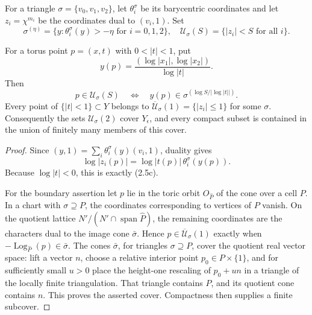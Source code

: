 For a triangle \(\sigma=\{v_0,v_1,v_2\}\), let
\(\theta_i^\sigma\) be its barycentric coordinates and let
\(z_i=\chi^{m_i}\) be the coordinates dual to
\((v_i,1)\).  Set
\[
 \sigma^{(\eta)}=\{y:\theta_i^\sigma(y)>-\eta\text{ for }i=0,1,2\},
 \quad
 \mathcal U_\sigma(S)=\{|z_i|<S\text{ for all }i\}.
\]

\begin{lemma}
\label{lem:toric-chart-control}
For a torus point \(p=(x,t)\) with \(0<|t|<1\), put
\[
 y(p)=\frac{(\log|x_1|,\log|x_2|)}{\log|t|}.
\]
Then
\[
 p\in\mathcal U_\sigma(S)
 \quad\Longleftrightarrow\quad
 y(p)\in\sigma^{(\log S/|\log|t||)}.
 \tag{2.5c}
\]
Every point of \(\{|t|<1\}\subset Y\) belongs to
\(\overline{\mathcal U}_\sigma(1)=\{|z_i|\le1\}\) for some \(\sigma\).
Consequently the sets \(\mathcal U_\sigma(2)\) cover \(Y_\epsilon\), and
every compact subset is contained in the union of finitely many members of
this cover.
\end{lemma}

\begin{proof}
Since \((y,1)=\sum_i\theta_i^\sigma(y)(v_i,1)\), duality gives
\[
 \log|z_i(p)|=\log|t(p)|\,\theta_i^\sigma(y(p)).
\]
Because \(\log|t|<0\), this is exactly (2.5c).

For the boundary assertion let \(p\) lie in the toric orbit
\(O_{\widehat P}\) of the cone over a cell \(P\).  In a chart with
\(\sigma\supseteq P\), the coordinates corresponding to vertices of
\(P\) vanish.  On the quotient lattice
\(N'/(N'\cap\operatorname{span}\widehat P)\), the remaining coordinates
are the characters dual to the image cone \(\bar\sigma\).  Hence
\(p\in\overline{\mathcal U}_\sigma(1)\) exactly when
\(-\operatorname{Log}_{\widehat P}(p)\in\bar\sigma\).
The cones \(\bar\sigma\), for triangles \(\sigma\supseteq P\), cover the
quotient real vector space: lift a vector \(n\), choose a relative interior
point \(p_0\in P\times\{1\}\), and for sufficiently small \(u>0\) place
the height-one rescaling of \(p_0+un\) in a triangle of the locally finite
triangulation.  That triangle contains \(P\), and its quotient cone contains
\(n\).  This proves the asserted cover.  Compactness then supplies a finite
subcover.
\end{proof}

